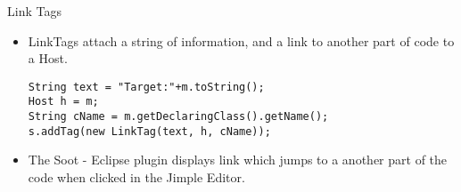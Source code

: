 \begin{slide}{Link Tags}
\begin{itemize}
\item {\red LinkTag}s attach a string of information, and a link to another part of code to a {\red Host}.
{\scriptsize
\begin{verbatim}
String text = "Target:"+m.toString();
Host h = m;
String cName = m.getDeclaringClass().getName();
s.addTag(new LinkTag(text, h, cName));
\end{verbatim}
}
\item The Soot - Eclipse plugin displays link which jumps to a another part of the code when clicked in the Jimple Editor.
\end{itemize}
\end{slide}

